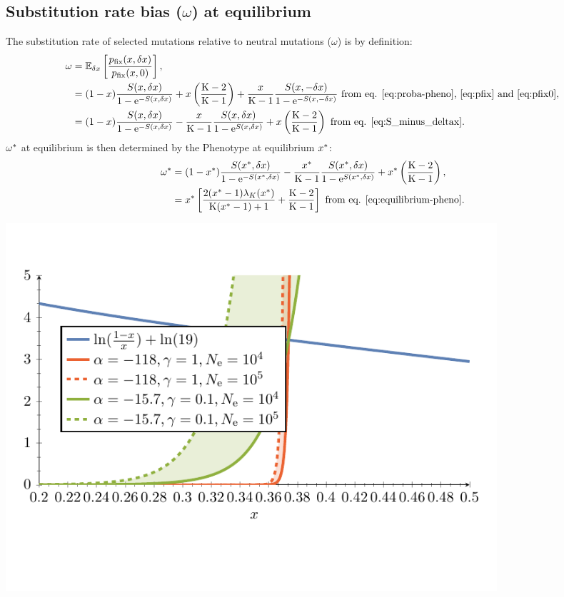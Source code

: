 \subsection{Substitution rate bias (\texorpdfstring{$\omega$}{ω}) at equilibrium}
The \gls{substitution} rate of selected mutations relative to \gls{neutral} mutations ($\omega$) is by definition:
\begin{align}
\omega & = \operatorname{\mathbb{E}}_{\delta x} \left[ \frac{p_{\text{fix}}(x, \delta x)}{p_{\text{fix}}(x, 0)} \right], \\
 & = (1 - x) \frac{ S(x, \delta x)}{1 - \mathrm{e}^{-S(x, \delta x)}} + x \left(\frac{\text{K} - 2}{\text{K} - 1}\right) + \frac{x}{\text{K}-1} \frac{ S(x, -\delta x)}{1 - \mathrm{e}^{-S(x, -\delta x)}} \text{ from eq. \ref{eq:proba-pheno}, \ref{eq:pfix} and \ref{eq:pfix0}}, \\
 & = (1 - x) \frac{ S(x, \delta x)}{1 - \mathrm{e}^{-S(x, \delta x)}} - \frac{x}{\text{K}-1}  \frac{ S(x, \delta x)}{1 - \mathrm{e}^{S(x, \delta x)}} +  x \left(\frac{\text{K} - 2}{\text{K} - 1}\right) \text{ from eq. \ref{eq:S_minus_deltax}}.
\end{align}
$\omega^{*}$ at equilibrium is then determined by the \gls{Phenotype} at equilibrium $x^{*}$:
\begin{align}
\omega^{*} &= (1 - x^{*}) \frac{ S(x^{*}, \delta x)}{1 - \mathrm{e}^{-S(x^{*}, \delta x)}} - \frac{x^{*}}{\text{K}-1} \frac{ S(x^{*}, \delta x)}{1 - \mathrm{e}^{S(x^{*}, \delta x)}} + x^{*} \left(\frac{\text{K} - 2}{\text{K} - 1}\right) , \\
 &= x^{*} \left[ \frac{2 (x^{*}-1)  \lambda_{K}(x^{*}) }{\text{K} (x^{*}-1)+1} + \frac{\text{K} - 2}{\text{K} - 1}\right] \text{ from eq. \ref{eq:equilibrium-pheno}}.
\end{align}
\begin{center}
 \includegraphics[width=0.8\textwidth, page=2] {analytical-relaxation}
\end{center}
